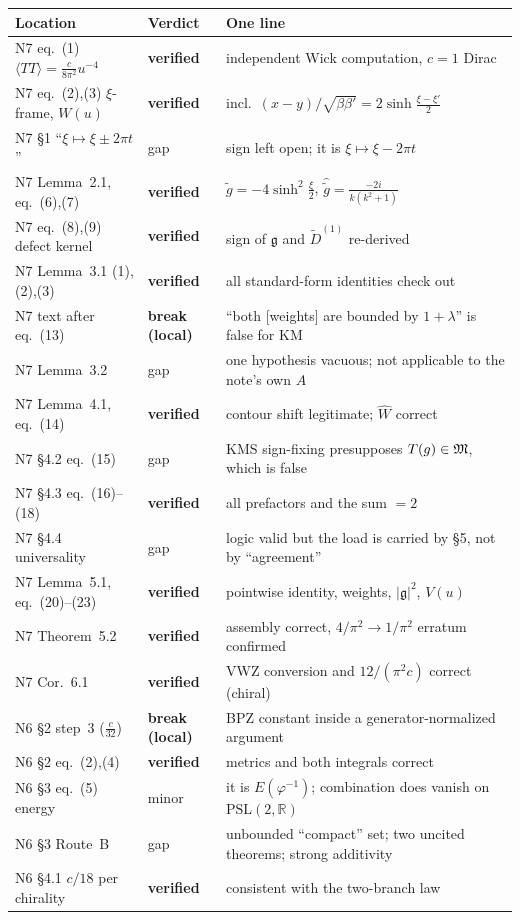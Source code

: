 \documentclass[11pt]{article}
\begin{document}
\begin{center}\footnotesize
\begin{tabular}{llp{6.3cm}}\toprule
Location & Verdict & One line\\\midrule
N7 eq.~(1) $\langle TT\rangle=\frac{c}{8\pi^2}u^{-4}$ & \textbf{verified} & independent Wick computation, $c=1$ Dirac\\
N7 eq.~(2),(3) $\xi$-frame, $W(u)$ & \textbf{verified} & incl.\ $(x-y)/\sqrt{\beta\beta'}=2\sinh\frac{\xi-\xi'}2$\\
N7 \S1 ``$\xi\mapsto\xi\pm2\pi t$'' & gap & sign left open; it is $\xi\mapsto\xi-2\pi t$\\
N7 Lemma~2.1, eq.~(6),(7) & \textbf{verified} & $\widetilde g=-4\sinh^2\frac\xi2$, $\widehat{\widetilde g}=\frac{-2i}{k(k^2+1)}$\\
N7 eq.~(8),(9) defect kernel & \textbf{verified} & sign of $\mathfrak g$ and $\widetilde D^{(1)}$ re-derived\\
N7 Lemma~3.1 (1),(2),(3) & \textbf{verified} & all standard-form identities check out\\
N7 text after eq.~(13) & \textbf{break (local)} & ``both [weights] are bounded by $1+\lambda$'' is false for KM\\
N7 Lemma~3.2 & gap & one hypothesis vacuous; not applicable to the note's own $A$\\
N7 Lemma~4.1, eq.~(14) & \textbf{verified} & contour shift legitimate; $\widehat W$ correct\\
N7 \S4.2 eq.~(15) & gap & KMS sign-fixing presupposes $T(g)\in\mathfrak M$, which is false\\
N7 \S4.3 eq.~(16)--(18) & \textbf{verified} & all prefactors and the sum $=2$\\
N7 \S4.4 universality & gap & logic valid but the load is carried by \S5, not by ``agreement''\\
N7 Lemma~5.1, eq.~(20)--(23) & \textbf{verified} & pointwise identity, weights, $|\mathfrak g|^2$, $V(u)$\\
N7 Theorem~5.2 & \textbf{verified} & assembly correct, $4/\pi^2\to1/\pi^2$ erratum confirmed\\
N7 Cor.~6.1 & \textbf{verified} & VWZ conversion and $12/(\pi^2c)$ correct (chiral)\\
N6 \S2 step~3 ($\frac c{32}$) & \textbf{break (local)} & BPZ constant inside a generator-normalized argument\\
N6 \S2 eq.~(2),(4) & \textbf{verified} & metrics and both integrals correct\\
N6 \S3 eq.~(5) energy & minor & it is $E(\varphi^{-1})$; combination does vanish on $\mathrm{PSL}(2,\mathbb R)$\\
N6 \S3 Route~B & gap & unbounded ``compact'' set; two uncited theorems; strong additivity\\
N6 \S4.1 $c/18$ per chirality & \textbf{verified} & consistent with the two-branch law\\
\bottomrule\end{tabular}\end{center}
\clearpage
\end{document}
